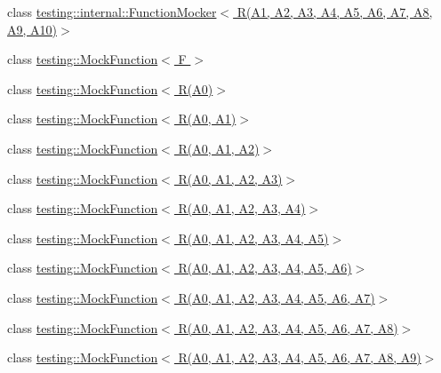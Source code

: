\begin{DoxyCompactItemize}
\item 
class \hyperlink{classtesting_1_1internal_1_1_function_mocker_3_01_r_07_a1_00_01_a2_00_01_a3_00_01_a4_00_01_a5_0038b5baf41d3183579372e0e15a9db969}{testing\+::internal\+::\+Function\+Mocker$<$ R(\+A1, A2, A3, A4, A5, A6, A7, A8, A9, A10)$>$}
\item 
class \hyperlink{classtesting_1_1_mock_function}{testing\+::\+Mock\+Function$<$ F $>$}
\item 
class \hyperlink{classtesting_1_1_mock_function_3_01_r_07_a0_08_4}{testing\+::\+Mock\+Function$<$ R(\+A0)$>$}
\item 
class \hyperlink{classtesting_1_1_mock_function_3_01_r_07_a0_00_01_a1_08_4}{testing\+::\+Mock\+Function$<$ R(\+A0, A1)$>$}
\item 
class \hyperlink{classtesting_1_1_mock_function_3_01_r_07_a0_00_01_a1_00_01_a2_08_4}{testing\+::\+Mock\+Function$<$ R(\+A0, A1, A2)$>$}
\item 
class \hyperlink{classtesting_1_1_mock_function_3_01_r_07_a0_00_01_a1_00_01_a2_00_01_a3_08_4}{testing\+::\+Mock\+Function$<$ R(\+A0, A1, A2, A3)$>$}
\item 
class \hyperlink{classtesting_1_1_mock_function_3_01_r_07_a0_00_01_a1_00_01_a2_00_01_a3_00_01_a4_08_4}{testing\+::\+Mock\+Function$<$ R(\+A0, A1, A2, A3, A4)$>$}
\item 
class \hyperlink{classtesting_1_1_mock_function_3_01_r_07_a0_00_01_a1_00_01_a2_00_01_a3_00_01_a4_00_01_a5_08_4}{testing\+::\+Mock\+Function$<$ R(\+A0, A1, A2, A3, A4, A5)$>$}
\item 
class \hyperlink{classtesting_1_1_mock_function_3_01_r_07_a0_00_01_a1_00_01_a2_00_01_a3_00_01_a4_00_01_a5_00_01_a6_08_4}{testing\+::\+Mock\+Function$<$ R(\+A0, A1, A2, A3, A4, A5, A6)$>$}
\item 
class \hyperlink{classtesting_1_1_mock_function_3_01_r_07_a0_00_01_a1_00_01_a2_00_01_a3_00_01_a4_00_01_a5_00_01_a6_00_01_a7_08_4}{testing\+::\+Mock\+Function$<$ R(\+A0, A1, A2, A3, A4, A5, A6, A7)$>$}
\item 
class \hyperlink{classtesting_1_1_mock_function_3_01_r_07_a0_00_01_a1_00_01_a2_00_01_a3_00_01_a4_00_01_a5_00_01_a6_00_01_a7_00_01_a8_08_4}{testing\+::\+Mock\+Function$<$ R(\+A0, A1, A2, A3, A4, A5, A6, A7, A8)$>$}
\item 
class \hyperlink{classtesting_1_1_mock_function_3_01_r_07_a0_00_01_a1_00_01_a2_00_01_a3_00_01_a4_00_01_a5_00_01_a654a9d62da83bde10dfec0368733bb48}{testing\+::\+Mock\+Function$<$ R(\+A0, A1, A2, A3, A4, A5, A6, A7, A8, A9)$>$}
\end{DoxyCompactItemize}
